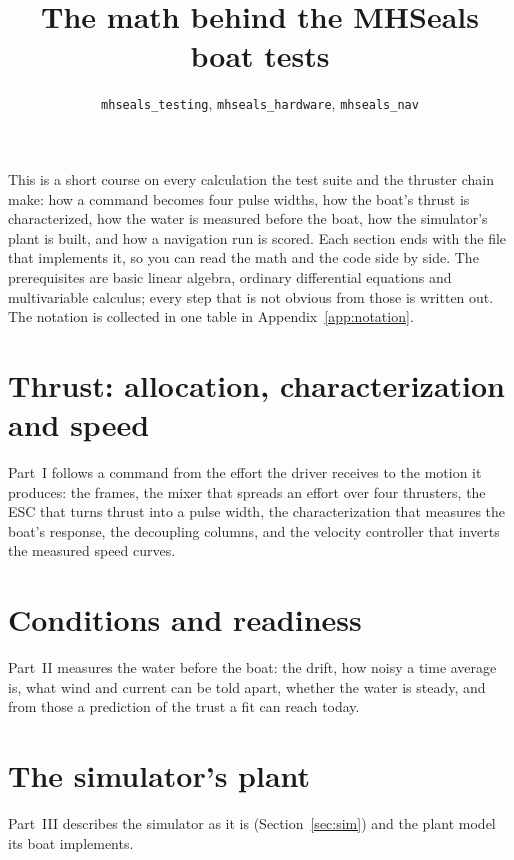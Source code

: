 \documentclass[11pt]{article}
\title{The math behind the MHSeals boat tests}
\author{\texttt{mhseals\_testing}, \texttt{mhseals\_hardware}, \texttt{mhseals\_nav}}
\date{}
\begin{document}
\maketitle

\noindent This is a short course on every calculation the test suite and the
thruster chain make: how a command becomes four pulse widths, how the boat's
thrust is characterized, how the water is measured before the boat, how the
simulator's plant is built, and how a navigation run is scored. Each section
ends with the file that implements it, so you can read the math and the code
side by side. The prerequisites are basic linear algebra, ordinary differential
equations and multivariable calculus; every step that is not obvious from those
is written out. The notation is collected in one table in
Appendix~\ref{app:notation}.

\tableofcontents
\bigskip

\clearpage
\part{Thrust: allocation, characterization and speed}
\label{part:thrust}
\noindent Part~I follows a command from the effort the driver receives to the
motion it produces: the frames, the mixer that spreads an effort over four
thrusters, the ESC that turns thrust into a pulse width, the characterization
that measures the boat's response, the decoupling columns, and the velocity
controller that inverts the measured speed curves.








\clearpage
\part{Conditions and readiness}
\label{part:conditions}
\noindent Part~II measures the water before the boat: the drift, how noisy a
time average is, what wind and current can be told apart, whether the water is
steady, and from those a prediction of the trust a fit can reach today.



\clearpage
\part{The simulator's plant}
\label{part:s2r}
\noindent Part~III describes the simulator as it is (Section~\ref{sec:sim}) and
the plant model its boat implements.
\end{document}
